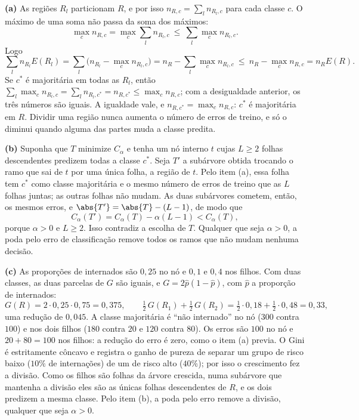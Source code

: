 \begin{solucao}
\textbf{(a)} As regiões $R_l$ particionam $R$, e por isso $n_{R,c}=\sum_ln_{R_l,c}$ para
cada classe $c$. O máximo de uma soma não passa da soma dos máximos:
\[
  \max_cn_{R,c}=\max_c\sum_ln_{R_l,c}\ \le\ \sum_l\max_cn_{R_l,c} .
\]
Logo
\[
  \sum_ln_{R_l}E(R_l)=\sum_l\Big(n_{R_l}-\max_cn_{R_l,c}\Big)=n_R-\sum_l\max_cn_{R_l,c}
  \ \le\ n_R-\max_cn_{R,c}=n_RE(R).
\]
Se $c^*$ é majoritária em todas as $R_l$, então
$\sum_l\max_cn_{R_l,c}=\sum_ln_{R_l,c^*}=n_{R,c^*}\le\max_cn_{R,c}$; com a desigualdade
anterior, os três números são iguais. A igualdade vale, e $n_{R,c^*}=\max_cn_{R,c}$: $c^*$ é
majoritária em $R$. Dividir uma região nunca aumenta o número de erros de treino, e só o
diminui quando alguma das partes muda a classe predita.

\smallskip
\textbf{(b)} Suponha que $T$ minimize $C_\alpha$ e tenha um nó interno $t$ cujas
$L\ge2$ folhas descendentes predizem todas a classe $c^*$. Seja $T'$ a subárvore obtida
trocando o ramo que sai de $t$ por uma única folha, a região de $t$. Pelo item (a), essa folha
tem $c^*$ como classe majoritária e o mesmo número de erros de treino que as $L$ folhas
juntas; as outras folhas não mudam. As duas subárvores cometem, então, os mesmos erros, e
$\abs{T'}=\abs{T}-(L-1)$, de modo que
\[
  C_\alpha(T')=C_\alpha(T)-\alpha(L-1)<C_\alpha(T),
\]
porque $\alpha>0$ e $L\ge2$. Isso contradiz a escolha de $T$. Qualquer que seja $\alpha>0$, a
poda pelo erro de classificação remove todos os ramos que não mudam nenhuma decisão.

\smallskip
\textbf{(c)} As proporções de internados são $0{,}25$ no nó e $0{,}1$ e $0{,}4$ nos filhos. Com
duas classes, as duas parcelas de $G$ são iguais, e $G=2\widehat p(1-\widehat p)$, com
$\widehat p$ a proporção de internados:
\[
  G(R)=2\cdot0{,}25\cdot0{,}75=0{,}375,
  \qquad
  \tfrac12\,G(R_1)+\tfrac12\,G(R_2)=\tfrac12\cdot0{,}18+\tfrac12\cdot0{,}48=0{,}33 ,
\]
uma redução de $0{,}045$. A classe majoritária é ``não internado'' no nó ($300$ contra $100$) e
nos dois filhos ($180$ contra $20$ e $120$ contra $80$). Os erros são $100$ no nó e
$20+80=100$ nos filhos: a redução do erro é zero, como o item (a) previa. O Gini é
estritamente côncavo e registra o ganho de pureza de separar um grupo de risco baixo
($10\%$ de internações) de um de risco alto ($40\%$); por isso o crescimento fez a divisão.
Como os filhos são folhas da árvore crescida, numa subárvore que mantenha a divisão eles são
as únicas folhas descendentes de $R$, e os dois predizem a mesma classe. Pelo item (b), a poda
pelo erro remove a divisão, qualquer que seja $\alpha>0$.


\end{solucao}
